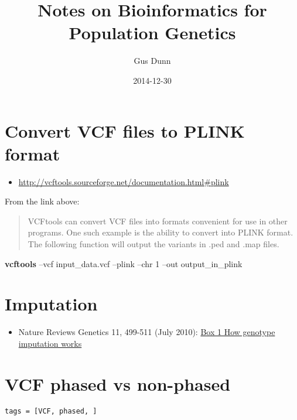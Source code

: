 \documentclass[letterpaper]{scrartcl}
\title{Notes on Bioinformatics for Population Genetics}
\author{Gus Dunn}
\date{2014-12-30}
\newenvironment{Shaded}{}{}
\newcommand{\KeywordTok}[1]{\textcolor[rgb]{0.00,0.44,0.13}{\textbf{{#1}}}}
\newcommand{\NormalTok}[1]{{#1}}
\begin{document}
\maketitle

{
\hypersetup{linkcolor=black}
\setcounter{tocdepth}{3}
\tableofcontents
}
\section{Convert VCF files to PLINK
format}\label{convert-vcf-files-to-plink-format}

\begin{itemize}
\itemsep1pt\parskip0pt
\item
  \url{http://vcftools.sourceforge.net/documentation.html\#plink}
\end{itemize}

From the link above:

\begin{quote}
VCFtools can convert VCF files into formats convenient for use in other
programs. One such example is the ability to convert into PLINK format.
The following function will output the variants in .ped and .map files.
\end{quote}

\begin{Shaded}
\begin{Highlighting}[]
    \KeywordTok{vcftools} \NormalTok{--vcf input_data.vcf --plink --chr 1 --out output_in_plink}
\end{Highlighting}
\end{Shaded}

\section{Imputation}\label{imputation}

\begin{itemize}
\itemsep1pt\parskip0pt
\item
  Nature Reviews Genetics 11, 499-511 (July 2010):
  \href{http://www.nature.com/nrg/journal/v11/n7/box/nrg2796_BX1.html}{Box
  1 \textbar{} How genotype imputation works}
\end{itemize}

\section{VCF phased vs non-phased}\label{vcf-phased-vs-non-phased}

\begin{verbatim}
tags = [VCF, phased, ]
\end{verbatim}
\end{document}
